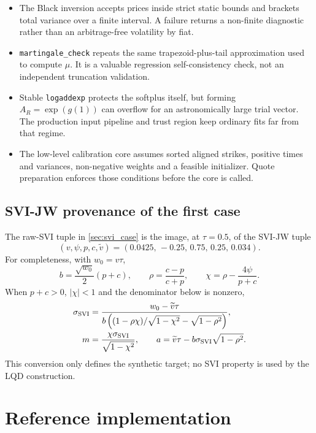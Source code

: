 \documentclass[11pt]{article}
\begin{document}
\begin{itemize}[leftmargin=1.4em]
\item The Black inversion accepts prices inside strict static bounds and
brackets total variance over a finite interval.  A failure returns a non-finite
diagnostic rather than an arbitrage-free volatility by fiat.
\item \texttt{martingale\_check} repeats the same trapezoid-plus-tail
approximation used to compute $\mu$.  It is a valuable regression
self-consistency check, not an independent truncation validation.
\item Stable \texttt{logaddexp} protects the softplus itself, but forming
$A_R=\exp(g(1))$ can overflow for an astronomically large trial vector.  The
production input pipeline and trust region keep ordinary fits far from that
regime.
\item The low-level calibration core assumes sorted aligned strikes, positive
times and variances, non-negative weights and a feasible initializer.  Quote
preparation enforces those conditions before the core is called.
\end{itemize}

\subsection{SVI-JW provenance of the first case}
\label{app:svijw}

The raw-SVI tuple in \cref{sec:svi_case} is the image, at $\tau=0.5$, of the
SVI-JW tuple
\[
(v,\psi,p,c,\widetilde v)=(0.0425,\,-0.25,\,0.75,\,0.25,\,0.034).
\]
For completeness, with $w_0=v\tau$,
\begin{equation}
b=\frac{\sqrt{w_0}}{2}(p+c),\qquad
\rho=\frac{c-p}{c+p},\qquad
\chi=\rho-\frac{4\psi}{p+c}.
\end{equation}
When $p+c>0$, $|\chi|<1$ and the denominator below is nonzero,
\begin{align}
\sigma_{\rm SVI}
&=\frac{w_0-\widetilde v\tau}
{b\left((1-\rho\chi)/\sqrt{1-\chi^2}-\sqrt{1-\rho^2}\right)},\\
m&=\frac{\chi\sigma_{\rm SVI}}{\sqrt{1-\chi^2}},\qquad
a=\widetilde v\tau-b\sigma_{\rm SVI}\sqrt{1-\rho^2}.
\end{align}
This conversion only defines the synthetic target; no SVI property is used by
the LQD construction.

\section{Reference implementation}
\label{app:reference}
\end{document}
